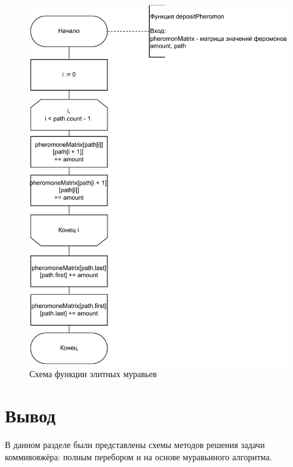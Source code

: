 \begin{figure}[h]
	\centering
	\includegraphics[width=1\linewidth]{img/ant4.pdf}
	\caption{Схема функции элитных муравьев}
	\label{img:ant4}
\end{figure}

\clearpage
\section*{Вывод}
В данном разделе были представлены схемы методов решения задачи коммивояжёра: полным перебором и на основе муравьиного алгоритма. 
